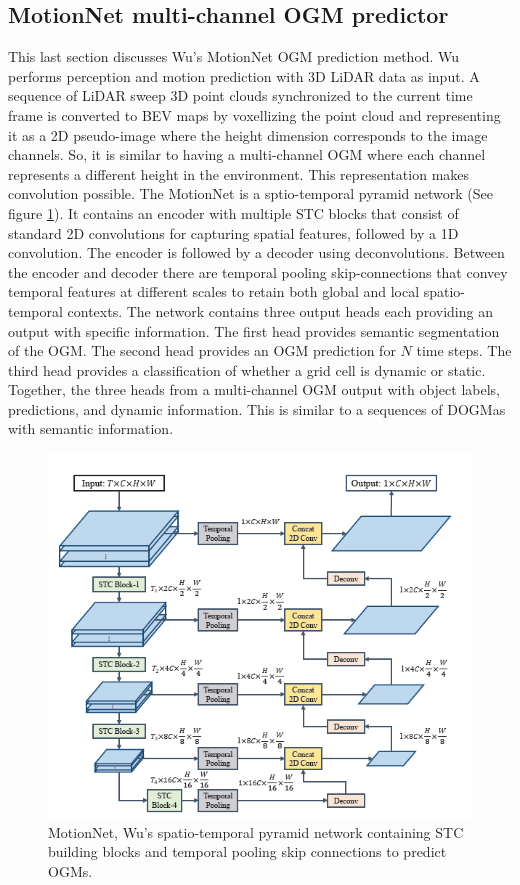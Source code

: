 \subsection{MotionNet multi-channel \gls{OGM} predictor} \label{subsec:motionnet}
This last section discusses Wu's \cite{wu2020motionnet} MotionNet \gls{OGM} prediction method. Wu \cite{wu2020motionnet} performs perception and motion prediction with 3D LiDAR data as input. A sequence of LiDAR sweep 3D point clouds synchronized to the current time frame is converted to \gls{BEV} maps by voxellizing the point cloud and representing it as a 2D pseudo-image where the height dimension corresponds to the image channels. So, it is similar to having a multi-channel \gls{OGM} where each channel represents a different height in the environment. This representation makes convolution possible. The MotionNet is a sptio-temporal pyramid network (See figure \ref{fig:spatiotemporal}). It contains an encoder with multiple \gls{STC} blocks that consist of standard 2D convolutions for capturing spatial features, followed by a 1D convolution. The encoder is followed by a decoder using deconvolutions. Between the encoder and decoder there are temporal pooling skip-connections that convey temporal features at different scales to retain both global and local spatio-temporal contexts. The network contains three output heads each providing an output with specific information. The first head provides semantic segmentation of the \gls{OGM}. The second head provides an \gls{OGM} prediction for $N$ time steps. The third head provides a classification of whether a grid cell is dynamic or static. Together, the three heads from a multi-channel \gls{OGM} output with object labels, predictions, and dynamic information. This is similar to a sequences of \glspl{DOGMa} with semantic information. \\


\begin{figure}[h]
	\centering
	\includegraphics[width=0.6\linewidth]{Figures/Methods/STC_Block}
	\caption{MotionNet, Wu's \cite{wu2020motionnet} spatio-temporal pyramid network containing \gls{STC} building blocks and temporal pooling skip connections to predict \glspl{OGM}.}
	\label{fig:spatiotemporal}
\end{figure}

